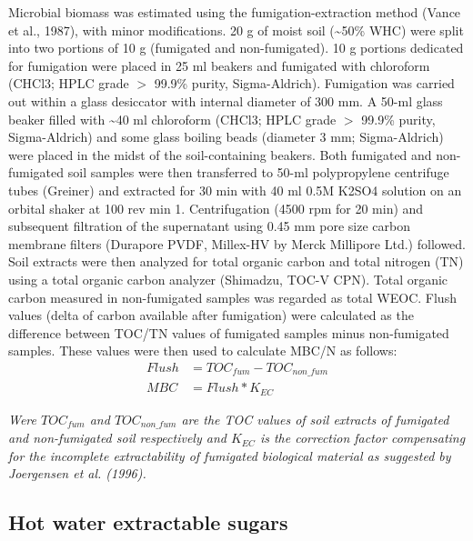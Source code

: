     	Microbial biomass was estimated using the fumigation-extraction method (Vance et al., 1987), with minor modifications. 20 g of moist soil (\~{}50\% WHC) were split into two portions of 10 g (fumigated and non-fumigated). 10 g portions dedicated for fumigation were placed in 25 ml beakers and fumigated with chloroform (CHCl3; HPLC grade $ > $ 99.9\% purity, Sigma-Aldrich). Fumigation was carried out within a glass desiccator with internal diameter of 300 mm. A 50-ml glass beaker filled with \~{}40 ml chloroform (CHCl3; HPLC grade $ > $ 99.9\% purity, Sigma-Aldrich) and some glass boiling beads (diameter 3 mm; Sigma-Aldrich) were placed in the midst of the soil-containing beakers.  Both fumigated and non-fumigated soil samples were then transferred to 50-ml polypropylene centrifuge tubes (Greiner) and extracted for 30 min with 40 ml 0.5M K2SO4 solution on an orbital shaker at 100 rev min 1. Centrifugation (4500 rpm for 20 min) and subsequent filtration of the supernatant using 0.45 mm pore size carbon membrane filters (Durapore PVDF, Millex-HV by Merck Millipore Ltd.) followed. Soil extracts were then analyzed for total organic carbon and total nitrogen (TN) using a total organic carbon analyzer (Shimadzu, TOC-V CPN). Total organic carbon measured in non-fumigated samples was regarded as total WEOC. Flush values (delta of carbon available after fumigation) were calculated as the difference between TOC/TN values of fumigated samples minus non-fumigated samples. These values were then used to calculate MBC/N as follows:\\


    	\begin{align}
    	Flush &= TOC_{fum} - TOC_{non\_fum}\\
    	MBC   &= Flush * K_{EC}
    	\end{align}

    	\begin{adjustwidth}{50pt}{50pt}
    		\begin{footnotesize}
    			\textit{Were $ TOC_{fum} $ and $ TOC_{non\_fum} $ are the TOC values of soil extracts of fumigated and non-fumigated soil respectively and $ K_{EC} $  is the correction factor compensating for the incomplete extractability of fumigated biological material as suggested by Joergensen et al. (1996).}\\
    		\end{footnotesize}
    	\end{adjustwidth}


    \subsection{Hot water extractable sugars}

